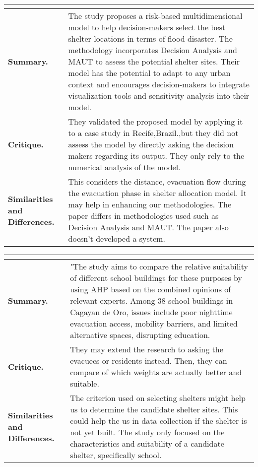 \begin{longtable}{|L{.2\linewidth}|L{.74\linewidth}|}
	\hline
	\\ \hline
	\textbf{Summary.} & The study proposes a risk-based multidimensional model to help decision-makers select the best shelter locations in terms of flood disaster. The methodology incorporates  Decision Analysis and MAUT to assess the potential shelter sites. Their model has the potential to adapt to any urban context and encourages decision-makers to integrate visualization tools and sensitivity analysis into their model. \\ \hline
	\textbf{Critique.} & They validated the proposed model by applying it to a case study in Recife,Brazil.,but they did not assess the model by directly asking the decision makers regarding its output. They only rely to the numerical analysis of the model. \\ \hline
	\textbf{Similarities and Differences.} & This considers the distance, evacuation flow during the evacuation phase in shelter allocation model. It may help in enhancing our methodologies.	The paper differs in methodologies used such as Decision Analysis and MAUT. The paper also doesn't developed a system. \\ \hline
\end{longtable}

\begin{longtable}{|L{.2\linewidth}|L{.74\linewidth}|}
	\hline
	\\ \hline
	\textbf{Summary.} & "The study aims to compare the relative suitability of different school buildings for these purposes by using AHP based on the combined opinions of relevant experts. Among 38 school buildings in Cagayan de Oro, issues include poor nighttime evacuation access, mobility barriers, and limited alternative spaces, disrupting education.\\ \hline
	\textbf{Critique.} &They may extend the research to asking the evacuees or residents instead. Then, they can compare of which weights are actually better and suitable. \\ \hline
	\textbf{Similarities and Differences.} & The criterion used on selecting shelters might help us to determine the candidate shelter sites. This could help the us in data collection if the shelter is not yet built.	The study only focused on the characteristics and suitability of a candidate shelter, specifically school. \\ \hline
\end{longtable}

